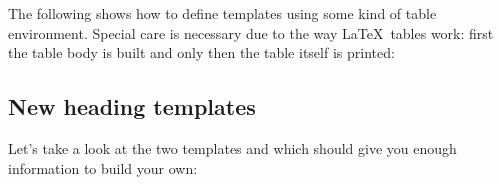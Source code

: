 \documentclass{acro-manual}
\begin{document}
The following shows how to define templates using some kind of table
environment.  Special care is necessary due to the way \LaTeX\ tables work:
first the table body is built and only then the table itself is printed:
\begin{sourcecode}
\end{sourcecode}

\begin{sourcecode}
\end{sourcecode}

\subsection{New heading templates}\label{sec:new-head-templ}
Let's take a look at the two templates  and
 which should give you enough information to build your
own:
\begin{sourcecode}
   {\section {\acrolistname}}
\end{sourcecode}
\end{document}

